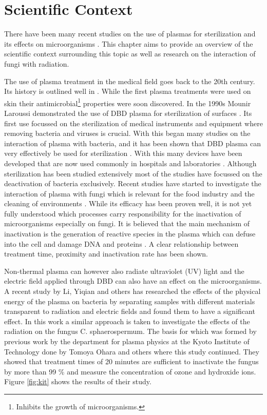\chapter{Scientific Context}
\label{chap:scientific_context}
There have been many recent studies on the use of plasmas for sterilization and its effects on microorganisms \cite{bacteria, app_study, kit, wound,inactivation}. This chapter aims to provide an overview of the scientific context surrounding this topic as well as research on the interaction of fungi with radiation.

The use of plasma treatment in the medical field goes back to the 20th century. Its history is outlined well in \cite{history}. While the first plasma treatments were used on skin their antimicrobial\footnote{Inhibits the growth of microorganisms.} properties were soon discovered. In the 1990s Mounir Laroussi demonstrated the use of DBD plasma for sterilization of surfaces \cite{laroussi}. Its first use focussed on the sterilization of medical instruments and equipment where removing bacteria and viruses is crucial. With this began many studies on the interaction of plasma with bacteria, and it has been shown that DBD plasma can very effectively be used for sterilization \cite{inactivation, app_study}. With this many devices have been developed that are now used commonly in hospitals and laboratories \cite{history}. Although sterilization has been studied extensively most of the studies have focussed on the deactivation of bacteria exclusively. Recent studies have started to investigate the interaction of plasma with fungi which is relevant for the food industry and the cleaning of environments  \cite{growth}. While its efficacy has been proven well, it is not yet fully understood which processes carry responsibility for the inactivation of microorganisms especially on fungi. It is believed that the main mechanism of inactivation is the generation of reactive species in the plasma which can defuse into the cell and damage DNA and proteins \cite{app_study, inactivation}. A clear relationship between treatment time, proximity and inactivation rate has been shown. 

Non-thermal plasma can however also radiate ultraviolet (UV) light and the electric field applied through DBD can also have an effect on the microorganisms. A recent study by Li, Yiqian and others \cite{bacteria} has researched the effects of the physical energy of the plasma on bacteria by separating samples with different materials transparent to radiation and electric fields and found them to have a significant effect. In this work a similar approach is taken to investigate the effects of the radiation on the fungus C. sphaerospermum. The basis for which was formed by previous work by the department for plasma physics at the Kyoto Institute of Technology done by Tomoya Ohara and others \cite{kit} where this study continued. They showed that treatment times of 20 minutes are sufficient to inactivate the fungus by more than 99 \% and measure the concentration of ozone and hydroxide ions. Figure \ref{fig:kit} shows the results of their study.

